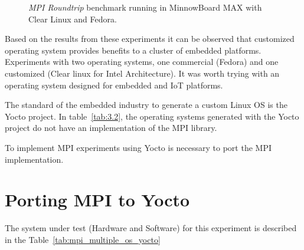 \begin{figure}[H]
\begin{center}
\end{center}
\caption{\textit{MPI Roundtrip} benchmark running in MinnowBoard MAX with Clear Linux and
Fedora.}
\label{mpi_roundtrip_clr_fedora}
\end{figure}

Based on the results from these experiments it can be observed that customized 
operating system provides benefits to a cluster of embedded platforms. Experiments 
with two operating systems, one commercial (Fedora) and one customized (Clear
linux for Intel Architecture). It was worth trying with an operating system
designed for embedded and IoT platforms. 

The standard of the embedded industry to generate a custom Linux OS
is the Yocto project. In table~\ref{tab:3.2}, the operating systems
generated with the Yocto project do not have an implementation of the MPI
library.

To implement MPI experiments using Yocto is necessary to port the MPI
implementation.


\section{Porting MPI to Yocto}

The system under test (Hardware and Software) for this experiment is described
in the Table~\ref{tab:mpi_multiple_os_yocto}

